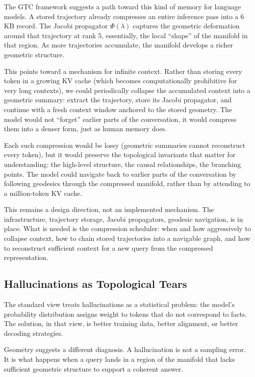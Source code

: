\documentclass[11pt]{article}
\begin{document}
The GTC framework suggests a path toward this kind of memory for language
models. A stored trajectory already compresses an entire inference pass into
a 6 KB record. The Jacobi propagator $\Phi(\lambda)$ captures the geometric
deformation around that trajectory at rank 5, essentially, the local
``shape'' of the manifold in that region. As more trajectories accumulate,
the manifold develops a richer geometric structure.

This points toward a mechanism for infinite context. Rather than storing
every token in a growing KV cache (which becomes computationally prohibitive
for very long contexts), we could periodically collapse the accumulated
context into a geometric summary: extract the trajectory, store its Jacobi
propagator, and continue with a fresh context window anchored to the stored
geometry. The model would not ``forget'' earlier parts of the conversation, it would compress them into a denser form, just as human memory does.

Each such compression would be lossy (geometric summaries cannot reconstruct
every token), but it would preserve the topological invariants that matter
for understanding: the high-level structure, the causal relationships, the
branching points. The model could navigate back to earlier parts of the
conversation by following geodesics through the compressed manifold, rather
than by attending to a million-token KV cache.

This remains a design direction, not an implemented mechanism. The
infrastructure, trajectory storage, Jacobi propagators, geodesic
navigation, is in place. What is needed is the compression scheduler:
when and how aggressively to collapse context, how to chain stored
trajectories into a navigable graph, and how to reconstruct sufficient
context for a new query from the compressed representation.

\subsection{Hallucinations as Topological Tears}

The standard view treats hallucinations as a statistical problem: the model's
probability distribution assigns weight to tokens that do not correspond to
facts. The solution, in that view, is better training data, better alignment,
or better decoding strategies.

Geometry suggests a different diagnosis. A hallucination is not a sampling
error. It is what happens when a query lands in a region of the manifold that
lacks sufficient geometric structure to support a coherent answer.
\end{document}
